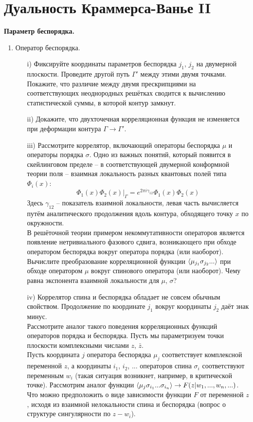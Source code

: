 \documentclass[12pt]{article}
\theoremstyle{definition}
\begin{document}
\section{Дуальность Краммерса-Ванье II}
\textbf{Параметр беспорядка.}
\begin{enumerate}
    \item Оператор беспорядка.
    \begin{itemize}
        \item[i)] Фиксируйте координаты параметров беспорядка $j_1$, $j_2$ на двумерной плоскости. Проведите другой путь $\Gamma'$ между этими двумя точками. Покажите, что различие между двумя прескрипциями на соответствующих неоднородных решётках сводится к вычислению статистической суммы, в которой контур замкнут.
        \item[ii)] Докажите, что двухточечная корреляционная функция не изменяется при деформации контура $\Gamma\rightarrow\Gamma'$.   
        \item[iii)] Рассмотрите коррелятор, включающий операторы беспорядка $\mu$ и операторы порядка $\sigma$. Одно из важных понятий, который появится в скейлинговом пределе -- в соответствующей двумерной конформной теории поля -- взаимная локальность разных квантовых полей типа $\Phi_i(x)$:
        \begin{equation}
            \Phi_1(x)\Phi_2(x)|_\Gamma=e^{2\pi i\gamma_{12}}\Phi_1(x)\Phi_2(x)
        \end{equation}
        Здесь $\gamma_{12}$ -- показатель взаимной локальности, левая часть вычисляется путём аналитического продолжения вдоль контура, обходящего точку $x$ по окружности.\\
        В решёточной теории примером некоммутативности операторов является появление нетривиального фазового сдвига, возникающего при обходе оператором беспорядка вокруг оператора порядка (или наоборот). Вычислите преобразование корреляционной функции $\braket{\mu_{j_1}\sigma_{j_2}...}$ при обходе оператором $\mu$ вокруг спинового оператора (или наоборот). Чему равна экспонента взаимной локальности для $\mu$, $\sigma$?
        \item[iv)] Коррелятор спина и беспорядка обладает не совсем обычным свойством. Продолжение по координате $j_1$ вокруг координаты $j_2$ даёт знак минус.\\
        Рассмотрите аналог такого поведения корреляционных функций операторов порядка и беспорядка. Пусть мы параметризуем точки плоскости комплексными числами $z$, $\bar z$.\\
        Пусть координата $j$ оператора беспорядка $\mu_j$ соответствует комплексной переменной $z$, а координаты $i_1$, $i_2$, ... операторов спина $\sigma_i$ соответствуют переменным $w_i$ (такая ситуация возникнет, например, в критической точке). Рассмотрим аналог функции $\braket{\mu_j\sigma_{i_1}...\sigma_{i_n}}\rightarrow F(z|w_1,...,w_n,...)$. Что можно предположить о виде зависимости функции $F$ от переменной $z$, исходя из взаимной нелокальности спина и беспорядка (вопрос о структуре сингулярности по $z-w_i$).

\end{itemize}
\end{enumerate}
\end{document}
